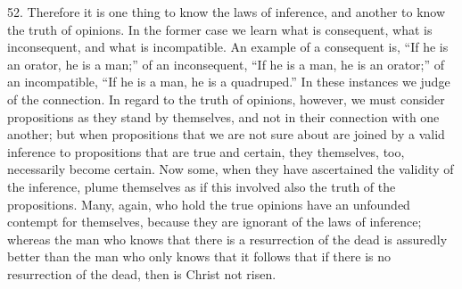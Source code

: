 52. Therefore it is one thing to know the laws of inference, and
another to know the truth of opinions. In the former case we learn
what is consequent, what is inconsequent, and what is incompatible. An
example of a consequent is, ``If he is an orator, he is a man;'' of an
inconsequent, ``If he is a man, he is an orator;'' of an incompatible,
``If he is a man, he is a quadruped.'' In these instances we judge of
the connection. In regard to the truth of opinions, however, we must
consider propositions as they stand by themselves, and not in their
connection with one another; but when propositions that we are not
sure about are joined by a valid inference to propositions that are
true and certain, they themselves, too, necessarily become certain.
Now some, when they have ascertained the validity of the inference,
plume themselves as if this involved also the truth of the
propositions. Many, again, who hold the true opinions have an
unfounded contempt for themselves, because they are ignorant of the
laws of inference; whereas the man who knows that there is a
resurrection of the dead is assuredly better than the man who only
knows that it follows that if there is no resurrection of the dead,
then is Christ not risen.

